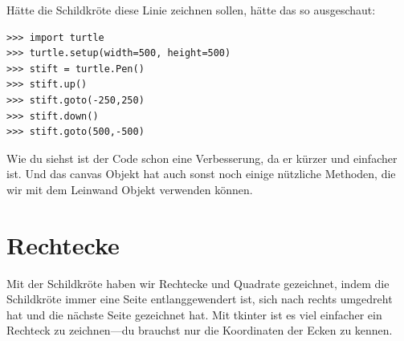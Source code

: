 \noindent
Hätte die Schildkröte diese Linie zeichnen sollen, hätte das so ausgeschaut:

\begin{Verbatim}[frame=single]
>>> import turtle
>>> turtle.setup(width=500, height=500)
>>> stift = turtle.Pen()
>>> stift.up()
>>> stift.goto(-250,250)
>>> stift.down()
>>> stift.goto(500,-500)
\end{Verbatim}

Wie du siehst ist der  Code schon eine Verbesserung, da er kürzer und einfacher ist. Und das canvas Objekt hat auch sonst noch einige nützliche Methoden, die wir mit dem Leinwand Objekt verwenden können.

\section{Rechtecke}

Mit der Schildkröte haben wir Rechtecke und Quadrate gezeichnet, indem die Schildkröte immer eine Seite entlanggewendert ist, sich nach rechts umgedreht hat und die nächste Seite gezeichnet hat. Mit tkinter ist es viel einfacher ein Rechteck zu zeichnen---du brauchst nur die Koordinaten der Ecken zu kennen.


